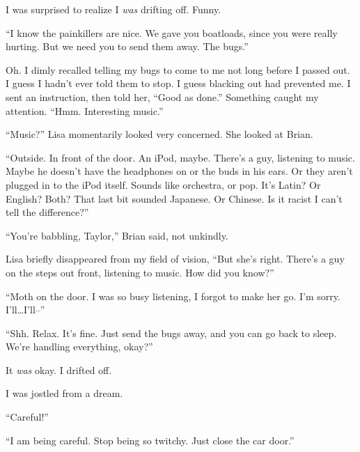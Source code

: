 I was surprised to realize I \emph{was} drifting off.  Funny.



``I know the painkillers are nice.  We gave you boatloads, since you were really hurting.  But we need you to send them away.  The bugs.''



Oh.  I dimly recalled telling my bugs to come to me not long before I passed out.  I guess I hadn't ever told them to stop.  I guess blacking out had prevented me.  I sent an instruction, then told her, ``Good as done.''  Something caught my attention. ``Hmm.  Interesting music.''



``Music?''  Lisa momentarily looked very concerned.  She looked at Brian.



``Outside.  In front of the door.  An iPod, maybe.  There's a guy, listening to music.  Maybe he doesn't have the headphones on or the buds in his ears.  Or they aren't plugged in to the iPod itself.  Sounds like orchestra, or pop.  It's Latin?  Or English?  Both?  That last bit sounded Japanese.  Or Chinese.  Is it racist I can't tell the difference?''



``You're babbling, Taylor,'' Brian said, not unkindly.



Lisa briefly disappeared from my field of vision, ``But she's right.  There's a guy on the steps out front, listening to music.  How did you know?''



``Moth on the door.  I was so busy listening, I forgot to make her go.  I'm sorry.  I'll\ldots I'll--''



``Shh.  Relax.  It's fine.  Just send the bugs away, and you can go back to sleep.  We're handling everything, okay?''



It \emph{was} okay.  I drifted off.



\sectionbreak



I was jostled from a dream.



``Careful!''



``I am being careful.  Stop being so twitchy.  Just close the car door.''



